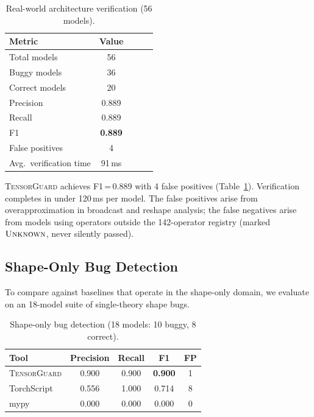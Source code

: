 \documentclass[10pt]{article}
\newcommand{\tguard}{\textsc{TensorGuard}}
\theoremstyle{plain}
\theoremstyle{definition}
\theoremstyle{remark}
\begin{document}
\begin{table}[t]
\centering
\caption{Real-world architecture verification (56 models).}
\label{tab:realworld}
\small
\begin{tabular}{@{}lcccc@{}}
\toprule
\textbf{Metric} & \textbf{Value} \\
\midrule
Total models       & 56 \\
Buggy models       & 36 \\
Correct models     & 20 \\
Precision          & 0.889 \\
Recall             & 0.889 \\
F1                 & \textbf{0.889} \\
False positives    & 4 \\
Avg.\ verification time & 91\,ms \\
\bottomrule
\end{tabular}
\end{table}

\tguard{} achieves F1\,=\,0.889 with 4 false positives
(Table~\ref{tab:realworld}).  Verification completes in under
120\,ms per model.  The false positives arise from
overapproximation in broadcast and reshape analysis; the false
negatives arise from models using operators outside the
142-operator registry (marked $\textsc{Unknown}$, never silently
passed).

\subsection{Shape-Only Bug Detection}

To compare against baselines that operate in the shape-only domain,
we evaluate on an 18-model suite of single-theory shape bugs.

\begin{table}[t]
\centering
\caption{Shape-only bug detection (18 models: 10 buggy, 8 correct).}
\label{tab:bugdetect}
\small
\begin{tabular}{@{}lcccc@{}}
\toprule
\textbf{Tool} & \textbf{Precision} & \textbf{Recall} &
  \textbf{F1} & \textbf{FP} \\
\midrule
\tguard{}   & 0.900 & 0.900 & \textbf{0.900} & 1 \\
TorchScript & 0.556 & 1.000 & 0.714 & 8 \\
mypy        & 0.000 & 0.000 & 0.000 & 0 \\
\bottomrule
\end{tabular}
\end{table}
\end{document}
